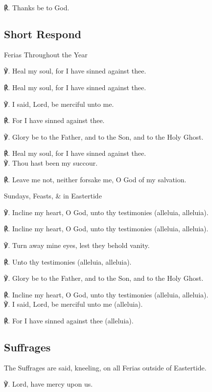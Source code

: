 \begin{multicols}{2}
℟. Thanks be to God.

\subsection{Short Respond}
\begin{inhead}
	Ferias Throughout the Year
\end{inhead}
℣. Heal my soul, for I have sinned against thee.

℟. Heal my soul, for I have sinned against thee.

℣. I said, Lord, be merciful unto me.
    
℟. For I have sinned against thee.

℣. Glory be to the Father, and to the Son, and to the Holy Ghost.
    
℟. Heal my soul, for I have sinned against thee.\\

℣. Thou hast been my succour.

℟. Leave me not, neither forsake me, O God of my salvation.

\begin{inhead}
	Sundays, Feasts, \& in Eastertide
\end{inhead}

℣. Incline my heart, O God, unto thy testimonies (alleluia, alleluia).

℟. Incline my heart, O God, unto thy testimonies (alleluia, alleluia).

℣. Turn away mine eyes, lest they behold vanity.

℟. Unto thy testimonies (alleluia, alleluia).

℣. Glory be to the Father, and to the Son, and to the Holy Ghost.

℟. Incline my heart, O God, unto thy testimonies (alleluia, alleluia).\\

℣. I said, Lord, be merciful unto me (alleluia).

℟. For I have sinned against thee (alleluia).

\subsection{Suffrages}
\begin{rubric}
	The Suffrages are said, kneeling, on all Ferias outside of Eastertide.
\end{rubric}

℣. Lord, have mercy upon us.


\end{multicols}
